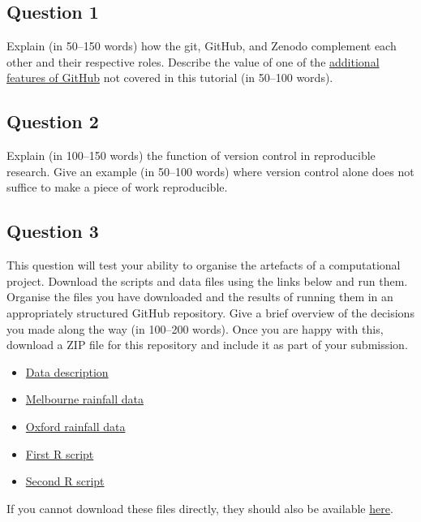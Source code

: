 \documentclass[11pt,onecolumn]{scrartcl}
\begin{document}
\subsection{Question 1}
\label{sec:orgae719ba}

Explain (in 50--150 words) how the git, GitHub, and Zenodo complement each other
and their respective roles. Describe the value of one of the \hyperref[sec:org8cdcd55]{additional features
of GitHub} not covered in this tutorial (in 50--100 words).

\subsection{Question 2}
\label{sec:orgdc09e91}

Explain (in 100--150 words) the function of version control in reproducible
research. Give an example (in 50--100 words) where version control alone does
not suffice to make a piece of work reproducible.

\subsection{Question 3}
\label{sec:org798c2ea}

This question will test your ability to organise the artefacts of a
computational project. Download the scripts and data files using the links below
and run them. Organise the files you have downloaded and the results of running
them in an appropriately structured GitHub repository. Give a brief overview of
the decisions you made along the way (in 100--200 words). Once you are happy
with this, download a ZIP file for this repository and include it as part of
your submission.

\begin{itemize}
\item \href{./homework-question-3/data-sources.txt}{Data description}
\item \href{./homework-question-3/melbourne.csv}{Melbourne rainfall data}
\item \href{./homework-question-3/oxford.txt}{Oxford rainfall data}
\item \href{./homework-question-3/combine-data.R}{First R script}
\item \href{./homework-question-3/make-plot.R}{Second R script}
\end{itemize}

If you cannot download these files directly, they should also be available \href{https://github.com/aezarebski/github-tutorial/tree/main/homework-question-3}{here}.
\end{document}
